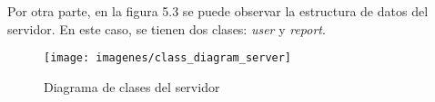 Por otra parte, en la figura 5.3 se puede observar la estructura de datos del servidor. En este caso, se tienen dos clases: \textit{user} y \textit{report}.

\begin{figure}[ht]
  \centering
  \texttt{[image: imagenes/class\_diagram\_server]}
  \caption{Diagrama de clases del servidor}
  \label{fig:classDiagramServer}
\end{figure}
%
%
%
%
%
